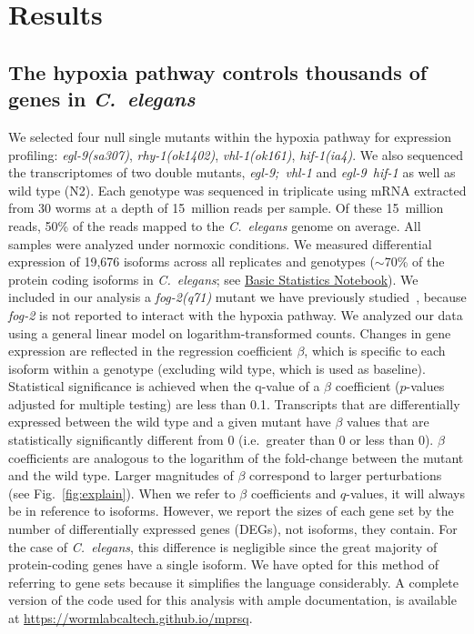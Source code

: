 \documentclass[9pt,twocolumn,twoside]{pnas-new}
\newcommand{\cel}{\emph{C.~elegans}}
\newcommand{\gene}[1]{\mbox{\emph{#1}}}
\begin{document}
\section*{Results}
\subsection*{The hypoxia pathway controls thousands of genes in \cel{}}
\label{sub:summary}

We selected four null single mutants within the hypoxia pathway for expression
profiling: \gene{egl-9(sa307)}, \gene{rhy-1(ok1402)}, \gene{vhl-1(ok161)},
\gene{hif-1(ia4)}. We also sequenced the transcriptomes of two double mutants,
\gene{egl-9; vhl-1} and \gene{egl-9 hif-1} as well as wild type (N2).
Each genotype was sequenced in triplicate using mRNA extracted from 30 worms at
a depth of 15~million reads per sample. Of these 15~million reads, 50\% of the
reads mapped to the \cel{} genome on average. All samples were analyzed under
normoxic conditions.
\color{black}
We
measured differential expression of 19,676 isoforms across all replicates and
genotypes ($\sim$70\% of the protein coding isoforms in \cel{}; see
\href{https://wormlabcaltech.github.io/mprsq/analysis_notebooks/1_basic_stats.html}
{Basic Statistics Notebook}). We included in our analysis a \gene{fog-2(q71)}
mutant we have previously studied~\cite{Angeles-Albores2017a}, because
\gene{fog-2} is not reported to interact with the hypoxia pathway. We analyzed
our data using a general linear model on logarithm-transformed counts. Changes
in gene expression are reflected in the regression coefficient $\beta$, which is
specific to each isoform within a genotype (excluding wild type, which is used
as baseline). Statistical significance is achieved when the q-value of a $\beta$
coefficient ($p$-values adjusted for multiple testing) are less than 0.1.
Transcripts that are differentially expressed between the wild type and a given
mutant have $\beta$ values that are statistically significantly different from 0
(i.e.\ greater than 0 or less than 0). $\beta$ coefficients are analogous to the
logarithm of the fold-change between the mutant and the wild type. Larger
magnitudes of $\beta$ correspond to larger perturbations (see
Fig.~\ref{fig:explain}). When we refer to $\beta$ coefficients and $q$-values,
it will always be in reference to isoforms. However, we report the sizes of each
gene set by the number of differentially expressed genes (DEGs), not isoforms,
they contain. For the case of \cel{}, this difference is negligible since the
great majority of protein-coding genes have a single isoform. We have opted for
this method of referring to gene sets because it simplifies the language
considerably. A complete version of the code used for this analysis with ample
documentation, is available at \url{https://wormlabcaltech.github.io/mprsq}.
\end{document}
